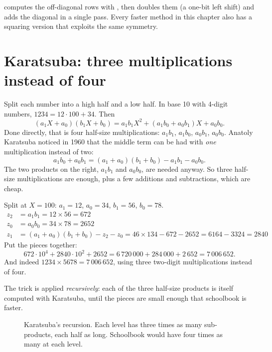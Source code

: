  computes the off-diagonal rows with , then doubles them
(a one-bit left shift) and adds the diagonal in a single pass. Every faster method in this
chapter also has a squaring version that exploits the same symmetry.

\section{Karatsuba: three multiplications instead of four}
\label{sec:karatsuba}

Split each number into a high half and a low half. In base 10 with 4-digit numbers,
$1234 = 12 \cdot 100 + 34$. Then
\[
(a_1 X + a_0)(b_1 X + b_0) = a_1 b_1 X^2 + (a_1 b_0 + a_0 b_1) X + a_0 b_0 .
\]
Done directly, that is four half-size multiplications: $a_1b_1$, $a_1b_0$, $a_0b_1$, $a_0b_0$.
Anatoly Karatsuba noticed in 1960 that the middle term can be had with \emph{one}
multiplication instead of two:
\[
a_1 b_0 + a_0 b_1 = (a_1 + a_0)(b_1 + b_0) - a_1 b_1 - a_0 b_0 .
\]
The two products on the right, $a_1b_1$ and $a_0b_0$, are needed anyway. So three
half-size multiplications are enough, plus a few additions and subtractions, which are
cheap.

\begin{example}
Split at $X = 100$: $a_1 = 12$, $a_0 = 34$, $b_1 = 56$, $b_0 = 78$.
\begin{align*}
z_2 &= a_1 b_1 = 12 \times 56 = 672\\
z_0 &= a_0 b_0 = 34 \times 78 = 2652\\
z_1 &= (a_1 + a_0)(b_1 + b_0) - z_2 - z_0 = 46 \times 134 - 672 - 2652 = 6164 - 3324 = 2840
\end{align*}
Put the pieces together:
\[
672 \cdot 10^4 + 2840 \cdot 10^2 + 2652 = 6\,720\,000 + 284\,000 + 2\,652 = 7\,006\,652 .
\]
And indeed $1234 \times 5678 = 7\,006\,652$, using three two-digit multiplications
instead of four.
\end{example}

The trick is applied \emph{recursively}: each of the three half-size products is itself
computed with Karatsuba, until the pieces are small enough that schoolbook is faster.

\begin{figure}[ht]
\centering
{}
\caption{Karatsuba's recursion. Each level has three times as many sub-products, each
half as long. Schoolbook would have four times as many at each level.}
\end{figure}

